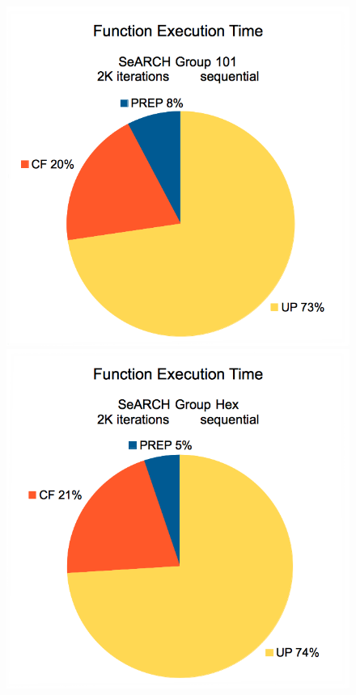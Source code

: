 \begin{figure}[!p]
	\begin{center}
		\includegraphics[width=\columnwidth]{report.may/images/loadseq101.png}
		\includegraphics[width=\columnwidth]{report.may/images/loadseqhex.png}

\end{center}
\end{figure}
